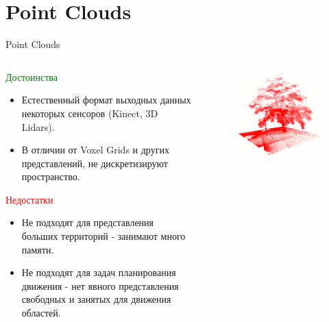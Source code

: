 \documentclass[9pt]{beamer}
\begin{document}

\section{Point Clouds}

\begin{frame}{Point Clouds}
\begin{columns}
\begin{column}{0.60\textwidth}
  \begin{block}{\textcolor{green}{Достоинства}}
    \begin{itemize}
    \item
    { 
      Естественный формат выходных данных некоторых сенсоров (Kinect, 3D Lidars).
    }
    \item
    {
      В отличии от Voxel Grids и других представлений, не дискретизируют пространство.  
    }
    \end{itemize}
  \end{block}

  \begin{block}{\textcolor{red}{Недостатки}}
    \begin{itemize}
    \item
    { 
      Не подходят для представления больших территорий - занимают много памяти.
    }
    \item
    {
      Не подходят для задач планирования движения - нет явного представления свободных и занятых для движения областей.
    }
    \end{itemize}
  \end{block}
\end{column}
\begin{column}{0.40\textwidth}
  \begin{figure}[h]
      \centering
      \includegraphics[width=1.\textwidth]{point_cloud_tree.png}
  \end{figure}
\end{column}
\end{columns}
\end{frame}
\end{document}
